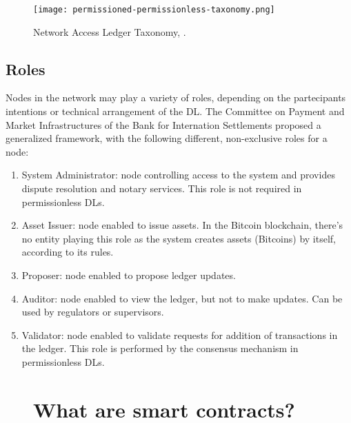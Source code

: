 \begin{figure}[h]
    \centering
    \texttt{[image: permissioned-permissionless-taxonomy.png]}
    \caption{
        Network Access Ledger Taxonomy, \cite{ukgovdltpaper}. 
        }
\end{figure}

\subsection{Roles}
Nodes in the network may play a variety of roles, depending on the partecipants intentions or technical arrangement of the DL. The Committee on Payment and Market Infrastructures of the Bank for Internation Settlements proposed a generalized framework, with the following different, non-exclusive roles for a node:

\begin{enumerate}
    \item System Administrator: node controlling access to the system and provides dispute resolution and notary services. This role is not required in permissionless DLs.
    \item Asset Issuer: node enabled to issue assets. In the Bitcoin blockchain, there's no entity playing this role as the system creates assets (Bitcoins) by itself, according to its rules.
    \item Proposer: node enabled to propose ledger updates.
    \item Auditor: node enabled to view the ledger, but not to make updates. Can be used by regulators or supervisors.
    \item Validator: node enabled to validate requests for addition of transactions in the ledger. This role is performed by the consensus mechanism in permissionless DLs.
\end{enumerate}


\begin{figure}[h]
    \begin{tcolorbox}[colframe=boxcolor]
        \section*{What are smart contracts?}
    \end{tcolorbox}
\end{figure}